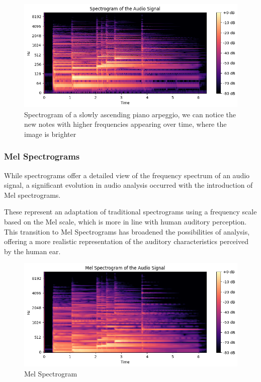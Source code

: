 \documentclass[11pt]{article}
\begin{document}
\begin{figure}[h]
  \centering
  \begin{minipage}{0.9\textwidth}
    \centering
    \includegraphics[width=1\textwidth]{"image/Spectrogram_piano.png"}
    \caption{Spectrogram of a slowly ascending piano arpeggio, we can notice the new notes with higher frequencies appearing over time, where the image is brighter}
    \label{fig:Spectrogram_piano}
  \end{minipage}\hfill
\end{figure}

\subsubsection{Mel Spectrograms}

While spectrograms offer a detailed view of the frequency spectrum of an audio signal, a significant evolution in audio analysis occurred with the introduction of Mel spectrograms.


These represent an adaptation of traditional spectrograms using a frequency scale based on the Mel scale, which is more in line with human auditory perception. This transition to Mel Spectrograms has broadened the possibilities of analysis, offering a more realistic representation of the auditory characteristics perceived by the human ear.


\begin{figure}[h]
  \centering
  \begin{minipage}{0.9\textwidth}
    \centering
    \includegraphics[width=1\textwidth]{"image/Mel_spectrogram_piano.png"}
    \caption{Mel Spectrogram}
    \label{fig:Mel_spectrogram_piano}
  \end{minipage}\hfill
\end{figure}
\end{document}
